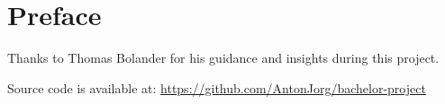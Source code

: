 \section*{Preface}

Thanks to Thomas Bolander for his guidance and insights during this project.

Source code is available at: \hyperlink{https://github.com/AntonJorg/bachelor-project}{https://github.com/AntonJorg/bachelor-project}